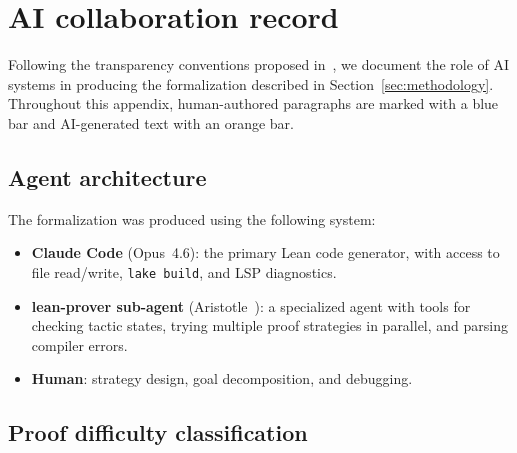 \section{AI collaboration record}\label{sec:appendix-ai}

Following the transparency conventions proposed in~\cite{schmitt2025}, we
document the role of AI systems in producing the formalization described in
Section~\ref{sec:methodology}. Throughout this appendix, human-authored
paragraphs are marked with a blue bar and AI-generated text with an orange bar.

\subsection{Agent architecture}

\begin{humanparagraph}
The formalization was produced using the following system:
\begin{itemize}
\item \textbf{Claude Code} (Opus~4.6): the primary Lean code generator, with
  access to file read/write, \texttt{lake build}, and LSP diagnostics.
\item \textbf{lean-prover sub-agent} (Aristotle~\cite{achim2025aristotleimolevelautomatedtheorem}): a
  specialized agent with tools for checking tactic states, trying multiple
  proof strategies in parallel, and parsing compiler errors.
\item \textbf{Human}: strategy design, goal decomposition, and debugging.
\end{itemize}
\end{humanparagraph}

\subsection{Proof difficulty classification}

